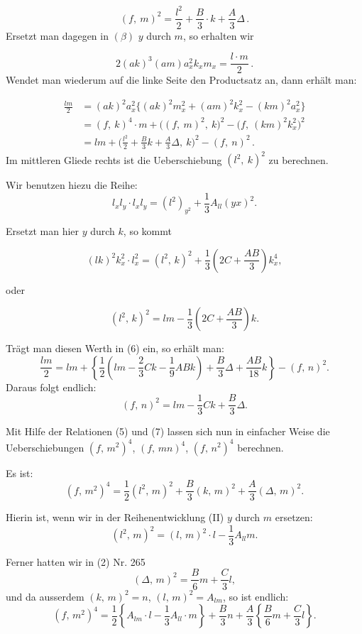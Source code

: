 \documentclass[11pt]{article}
\providecommand{\weberpage}[1]{}
\providecommand{\weq}[2]{\begin{equation}\tag{#1}#2\end{equation}}
\let\Delta\varDelta
\begin{document}
\weq{5}{(f,\ m)^2 = \frac{l^2}{2}+\frac{B}{3}\cdot k+\frac{A}{3}\Delta\,.}
Ersetzt man dagegen in $(\beta)$ $y$ durch $m$, so erhalten wir

\[
2(ak)^3(am)a_x^2k_xm_x = \frac{l\cdot m}{2}\,.
\]
Wendet man wiederum auf die linke Seite den Productsatz an, dann erhält man:

\[
\begin{aligned}
\frac{lm}{2} &= (ak)^2a_x^2\big\{(ak)^2m_x^2+(am)^2k_x^2-(km)^2a_x^2\big\}\\
&= (f,\ k)^4\cdot m + \big((f,\ m)^2,\ k\big)^2-\big(f,\ (km)^2k_x^2\big)^2\\
&= lm+\Big(\frac{l^2}{2}+\frac{B}{3}k+\frac{A}{3}\Delta,\ k\Big)^2-(f,\ n)^2\,.
\end{aligned}
\]
Im mittleren Gliede rechts ist die Ueberschiebung $(l^2,\ k)^2$ zu berechnen.


\weberpage{289}

Wir benutzen hiezu die Reihe:
\weq{II}{l_x l_y \cdot l_x l_y = (l^2)_{y^2} + \frac{1}{3} A_{ll} (yx)^2.}

Ersetzt man hier $y$ durch $k$, so kommt

\[
(lk)^2 k_x^2 \cdot l_x^2 = (l^2,\, k)^2 + \frac{1}{3}\left(2C+\frac{AB}{3}\right)k_x^4,
\]

oder

\[
(l^2,\, k)^2 = lm - \frac{1}{3}\left(2C+\frac{AB}{3}\right)k.
\]

Trägt man diesen Werth in (6) ein, so erhält man:
\[
\frac{lm}{2} = lm + \left\{\frac{1}{2}\left(lm-\frac{2}{3}Ck-\frac{1}{9}ABk\right)+\frac{B}{3}\Delta+\frac{AB}{18}k\right\}-(f,\,n)^2.
\]
Daraus folgt endlich:
\weq{7}{(f,\,n)^2 = lm - \frac{1}{3}Ck + \frac{B}{3}\Delta.}

Mit Hilfe der Relationen (5) und (7) lassen sich nun in einfacher Weise die Ueberschiebungen $(f,\,m^2)^4$, $(f,\,mn)^4$, $(f,\,n^2)^4$ berechnen.

Es ist:
\[
(f,\,m^2)^4 = \frac{1}{2}(l^2,\,m)^2+\frac{B}{3}(k,\,m)^2+\frac{A}{3}(\Delta,\,m)^2.
\]

Hierin ist, wenn wir in der Reihenentwicklung (II) $y$ durch $m$ ersetzen:
\[
(l^2,\,m)^2=(l,\,m)^2\cdot l - \frac{1}{3}A_{ll}m.
\]

Ferner hatten wir in (2) Nr. 265
\[
(\Delta,\,m)^2=\frac{B}{6}m+\frac{C}{3}l,
\]
und da ausserdem $(k,\,m)^2=n$, $(l,\,m)^2=A_{lm}$, so ist endlich:
\[
(f,\,m^2)^4=\frac{1}{2}\left\{A_{lm}\cdot l - \frac{1}{3}A_{ll}\cdot m\right\}+\frac{B}{3}n+\frac{A}{3}\left\{\frac{B}{6}m+\frac{C}{3}l\right\}.
\]
\end{document}
